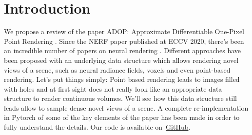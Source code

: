 \section{Introduction}
\label{sec:intro}
We propose a review of the paper ADOP: Approximate Differentiable One-Pixel Point Rendering \citet{ruckert2022adop}. 
Since the NERF paper published at ECCV 2020, there's been an incredible number of papers on neural rendering . Different approaches have been proposed with an underlying data structure which allows rendering novel views of a scene, such as neural radiance fields, voxels and even point-based rendering.
Let's put things simply: Point based rendering leads to images filled with holes and at first sight does not really look like an appropriate data structure to render continuous volumes.
We'll see how this data structure still leads allow to sample dense novel views of a scene.
A complete re-implementation in Pytorch of some of the key elements of the paper has been made in order to fully understand the details. 
Our code is available on~\href{https://github.com/balthazarneveu/per-pixel-point-rendering}{GitHub}.

